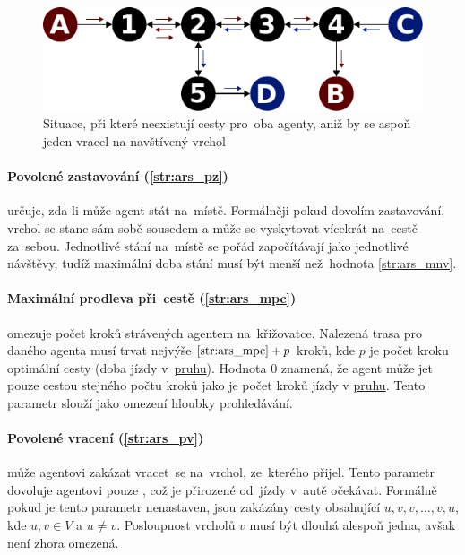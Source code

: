 \begin{figure}[h]
	\centering
	\includegraphics[width=140mm]{../img/mnv_example}
	\caption{Situace, při které neexistují cesty pro~oba agenty, aniž by se aspoň jeden vracel na navštívený vrchol}
	\label{fig:ars_mnv_example}
\end{figure}

\paragraph{Povolené zastavování (\ref{str:ars_pz})}
určuje, zda-li může agent stát na~místě.
Formálněji pokud dovolím zastavování, vrchol se stane sám sobě sousedem a může se vyskytovat vícekrát na~cestě za~sebou.
Jednotlivé stání na~místě se pořád započítávají jako jednotlivé návštěvy,
tudíž maximální doba stání musí být menší než~hodnota \ref{str:ars_mnv}.

\paragraph{Maximální prodleva při~cestě (\ref{str:ars_mpc})}
omezuje počet kroků strávených agentem na~křižovatce.
Nalezená trasa pro daného agenta musí trvat nejvýše $\ref{str:ars_mpc} + p$ kroků,
kde $p$ je počet kroku optimální cesty (doba jízdy v~\hyperref[par:pruh]{pruhu}).
Hodnota $0$ znamená, že agent může jet pouze cestou stejného počtu kroků
jako je počet kroků jízdy v \hyperref[par:pruh]{pruhu}.
Tento parametr slouží jako omezení hloubky prohledávání.

\paragraph{Povolené vracení (\ref{str:ars_pv})}
může agentovi zakázat vracet~se na~vrchol, ze~kterého přijel.
Tento parametr dovoluje agentovi pouze , což je přirozené od~jízdy v~autě očekávat.
Formálně pokud je tento parametr nenastaven, jsou zakázány cesty obsahující $u,v,v,\dots,v,u$,
kde $u, v \in V$ a $u \neq v$.
Posloupnost vrcholů $v$ musí být dlouhá alespoň jedna, avšak není zhora omezená.

